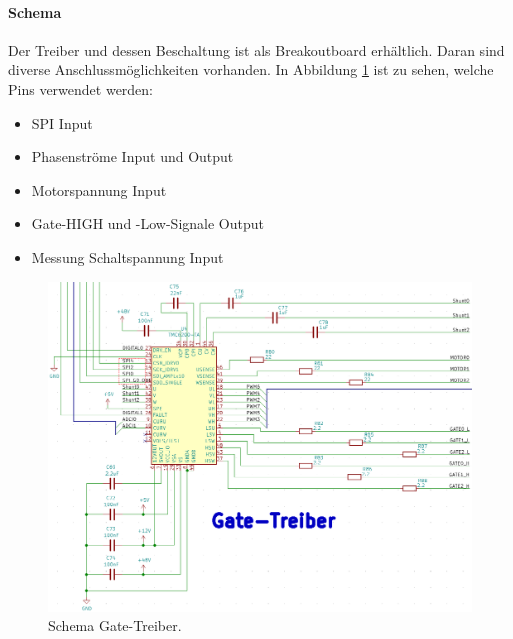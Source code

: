\paragraph{Schema}\mbox{}

Der Treiber und dessen Beschaltung ist als Breakoutboard erhältlich. Daran sind diverse Anschlussmöglichkeiten vorhanden. In Abbildung \ref{fig:Schema_Gate_Treiber} ist zu sehen, welche Pins verwendet werden:

\begin{itemize}
\item SPI Input
\item Phasenströme Input und Output
\item Motorspannung Input
\item Gate-HIGH und -Low-Signale Output
\item Messung Schaltspannung Input
\end{itemize}

\begin{figure}[H]
	\centering
	\includegraphics[width=\textwidth]{graphics/Schema_Gate_Treiber}
	\caption{Schema Gate-Treiber.}
	\label{fig:Schema_Gate_Treiber}
\end{figure}


